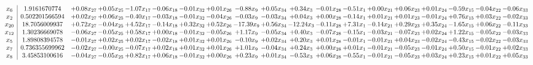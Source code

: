 \documentclass[9pt]{article}
\begin{document}
 \[\begin{array}{c| c c@{\hskip 2pt} c@{\hskip 2pt} c@{\hskip 2pt} c@{\hskip 2pt} c@{\hskip 2pt} c@{\hskip 2pt} c@{\hskip 2pt} c@{\hskip 2pt} c@{\hskip 2pt} c@{\hskip 2pt} c@{\hskip 2pt} c@{\hskip 2pt} c@{\hskip 2pt} c@{\hskip 2pt} c@{\hskip 2pt} c@{\hskip 2pt} c@{\hskip 2pt} }
 x_{6}   &  1.9161670774 & +  0.08 x_{27} & +  0.05 x_{25} & -1.07 x_{17} & -0.06 x_{18} & -0.01 x_{32} & +  0.01 x_{26} & -0.88 x_{9} & +  0.05 x_{34} & +  0.34 x_{3} & -0.01 x_{28} & -0.51 x_{1} & +  0.00 x_{21} & +  0.06 x_{23} & +  0.01 x_{24} & -0.59 x_{15} & -0.04 x_{22} & -0.06 x_{33}\\
 x_{2}   &  0.502201566594 & +  0.02 x_{27} & +  0.06 x_{25} & -0.40 x_{17} & -0.03 x_{18} & -0.01 x_{32} & -0.04 x_{26} & -0.03 x_{9} & -0.03 x_{34} & +  0.04 x_{3} & +  0.00 x_{28} & -0.14 x_{1} & +  0.01 x_{21} & +  0.01 x_{23} & -0.01 x_{24} & +  0.76 x_{15} & +  0.03 x_{22} & -0.02 x_{33}\\
 x_{20}   &  18.7056009937 & +  0.72 x_{27} & -0.04 x_{25} & +  4.52 x_{17} & -0.14 x_{18} & +  0.32 x_{32} & +  0.52 x_{26} & -17.39 x_{9} & +  0.56 x_{34} & -12.24 x_{3} & -0.11 x_{28} & +  7.31 x_{1} & -0.14 x_{21} & +  0.29 x_{23} & +  0.35 x_{24} & -1.65 x_{15} & +  0.06 x_{22} & -0.11 x_{33}\\
 x_{12}   &  1.30236669078 & -0.06 x_{27} & -0.05 x_{25} & +  0.58 x_{17} & +  0.00 x_{18} & -0.01 x_{32} & -0.05 x_{26} & +  1.17 x_{9} & -0.05 x_{34} & +  0.40 x_{3} & -0.07 x_{28} & -0.15 x_{1} & -0.03 x_{21} & -0.07 x_{23} & +  0.02 x_{24} & +  1.22 x_{15} & -0.05 x_{22} & -0.03 x_{33}\\
 x_{5}   &  1.89808394578 & -0.01 x_{27} & +  0.02 x_{25} & +  0.02 x_{17} & -0.02 x_{18} & +  0.01 x_{32} & +  0.01 x_{26} & -0.10 x_{9} & +  0.02 x_{34} & +  0.20 x_{3} & +  0.01 x_{28} & -0.01 x_{1} & -0.01 x_{21} & +  0.04 x_{23} & -0.02 x_{24} & -0.43 x_{15} & -0.02 x_{22} & -0.03 x_{33}\\
 x_{7}   &  0.736355699962 & -0.02 x_{27} & -0.00 x_{25} & -0.07 x_{17} & +  0.02 x_{18} & +  0.01 x_{32} & +  0.01 x_{26} & +  1.01 x_{9} & -0.04 x_{34} & +  0.24 x_{3} & +  0.00 x_{28} & +  0.01 x_{1} & -0.01 x_{21} & -0.05 x_{23} & -0.01 x_{24} & +  0.50 x_{15} & -0.01 x_{22} & +  0.02 x_{33}\\
 x_{8}   &  3.45853100616 & -0.04 x_{27} & -0.05 x_{25} & +  0.82 x_{17} & +  0.06 x_{18} & -0.01 x_{32} & +  0.00 x_{26} & +  0.23 x_{9} & +  0.01 x_{34} & -0.53 x_{3} & +  0.06 x_{28} & -0.55 x_{1} & -0.01 x_{21} & -0.05 x_{23} & +  0.03 x_{24} & +  0.23 x_{15} & +  0.01 x_{22} & +  0.05 x_{33}\\

\end{array}\]
\end{document}
